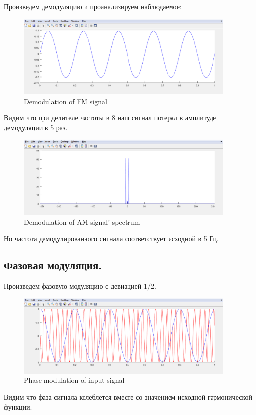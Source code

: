 \documentclass[a4paper,14pt]{extarticle}
\begin{document}
Произведем демодуляцию и проанализируем наблюдаемое:

\begin{figure}[H]
\centering
\includegraphics[width=0.95\textwidth]{fm_dm}
\captionsetup{justification=centering,margin=1.0cm}
\caption{Demodulation of FM signal}
\label{sig}
\end{figure}
Видим что при делителе частоты в 8 наш сигнал потерял в амплитуде демодуляции в 5 раз. 

\begin{figure}[H]
\centering
\includegraphics[width=0.95\textwidth]{fm_dm_sp}
\captionsetup{justification=centering,margin=1.0 cm}
\caption{Demodulation of AM signal' spectrum}
\label{any}
\end{figure}
Но частота демодулированного сигнала соответствует исходной в 5 Гц.

\subsection{Фазовая модуляция.}

Произведем фазовую модуляцию с девиацией 1/2.

\begin{figure}[H]
\centering
\includegraphics[width=0.95\textwidth]{pm}
\captionsetup{justification=centering,margin=1.0 cm}
\caption{Phase modulation of input signal}
\label{any}
\end{figure}
Видим что фаза сигнала колеблется вместе со значением исходной гармонической функции.
\end{document}
